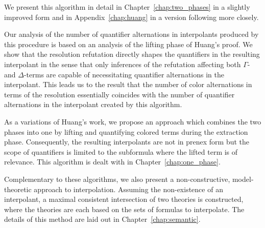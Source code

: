 We present this algorithm in detail in Chapter~\ref{chap:two_phases} in a slightly improved form and in Appendix~\ref{chap:huang} in a version following \cite{Huang95} more closely. 


Our analysis of the number of quantifier alternations in interpolants produced by this procedure is based on an analysis of the lifting phase of Huang's proof.
We show that the resolution refutation directly shapes the quantifiers in the resulting interpolant 
in the sense that only inferences of the refutation affecting both $\Gamma$-and $\Delta$-terms are capable of necessitating quantifier alternations in the interpolant.
This leads us to the result that 
the number of color alternations in terms of the resolution essentially coincides with the number of quantifier alternations in the interpolant created by this algorithm.





As a variations of Huang's work, we propose an approach which combines the two phases into one 
by lifting and quantifying colored terms during the extraction phase. 
Consequently, the resulting interpolants are not in prenex form but the scope of quantifiers is limited to the subformula where the lifted term is of relevance.
This algorithm is dealt with in Chapter~\ref{chap:one_phase}.

Complementary to these algorithms, we also present a non-constructive, model-theoretic approach to interpolation.
Assuming the non-existence of an interpolant, a maximal consistent intersection of two theories is constructed, where the theories are each based on the sets of formulas to interpolate. The details of this method are laid out in Chapter~\ref{chap:semantic}.


